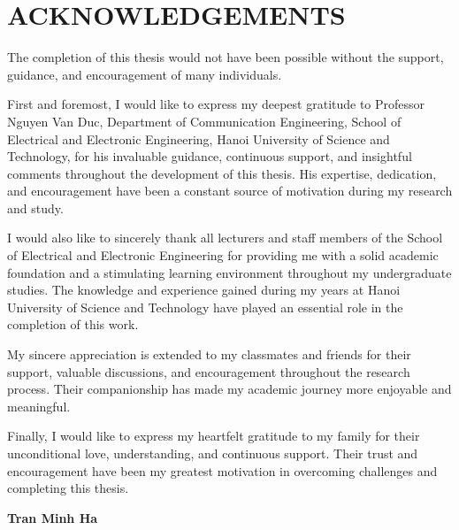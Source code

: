 \section*{ACKNOWLEDGEMENTS}
\thispagestyle{plain}

The completion of this thesis would not have been possible without the support, guidance, and encouragement of many individuals.

First and foremost, I would like to express my deepest gratitude to Professor Nguyen Van Duc, Department of Communication Engineering, School of Electrical and Electronic Engineering, Hanoi University of Science and Technology, for his invaluable guidance, continuous support, and insightful comments throughout the development of this thesis. His expertise, dedication, and encouragement have been a constant source of motivation during my research and study.

I would also like to sincerely thank all lecturers and staff members of the School of Electrical and Electronic Engineering for providing me with a solid academic foundation and a stimulating learning environment throughout my undergraduate studies. The knowledge and experience gained during my years at Hanoi University of Science and Technology have played an essential role in the completion of this work.

My sincere appreciation is extended to my classmates and friends for their support, valuable discussions, and encouragement throughout the research process. Their companionship has made my academic journey more enjoyable and meaningful.

Finally, I would like to express my heartfelt gratitude to my family for their unconditional love, understanding, and continuous support. Their trust and encouragement have been my greatest motivation in overcoming challenges and completing this thesis.

\vspace{1cm}

\begin{flushright}
\textbf{Tran Minh Ha}
\end{flushright}

\newpage
